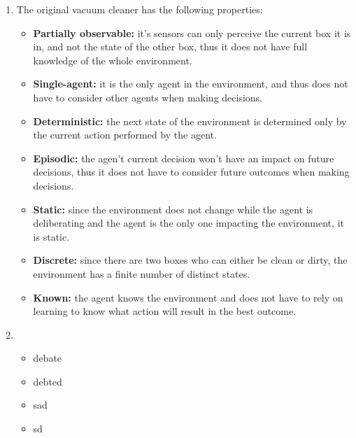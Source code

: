 \begin{enumerate}
\begin{itemize}
            [CD, OD] - Suck
            [CD, OC] - Suck
            [CC, OD] - Move to other box
            [CC, OC] - Do Nothing
    \end{itemize}
  \item
    The original vacuum cleaner has the following properties:
    \begin{itemize}
        \item 
            \textbf{Partially observable:} it's sensors can only perceive the 
            current box it is in, and not the state of the other box, thus it 
            does not have full knowledge of the whole environment. 
        \item 
            \textbf{Single-agent:} it is the only agent in the environment, and 
            thus does not have to consider other agents when making decisions.
        \item 
            \textbf{Deterministic:} the next state of the environment is
            determined only by the current action performed by the agent.
        \item 
            \textbf{Episodic:} the agen't current decision won't have an 
            impact on future decisions, thus it does not have to consider
            future outcomes when making decisions.
        \item 
            \textbf{Static:} since the environment does not change while the
            agent is deliberating and the agent is the only one impacting the 
            environment, it is static.
        \item 
            \textbf{Discrete:} since there are two boxes who can either be clean
            or dirty, the environment has a finite number of distinct states.
        \item 
            \textbf{Known:} the agent knows the environment and does not have to
            rely on learning to know what action will result in the best 
            outcome.
    \end{itemize}
  \item 
    \begin{itemize}
    \item debate
    \item debted
    \item sad
    \item sd
    \end{itemize}
\end{enumerate}

